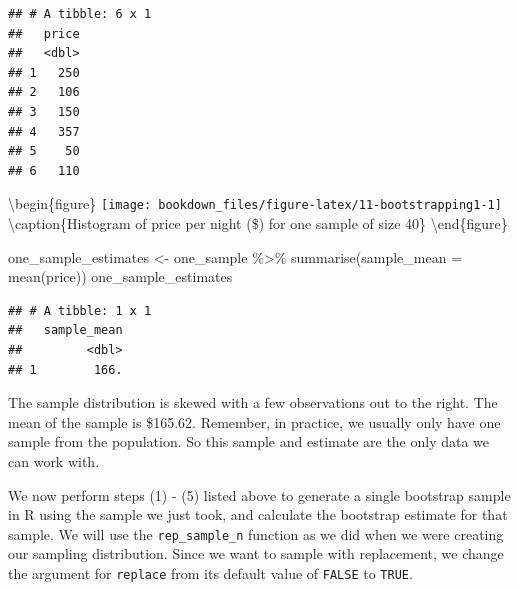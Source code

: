 \documentclass[
]{krantz}
\makeatletter
\newenvironment{Shaded}{\begin{snugshade}}{\end{snugshade}}
\newcommand{\AttributeTok}[1]{\textcolor[rgb]{0.61,0.61,0.61}{#1}}
\newcommand{\FunctionTok}[1]{\textcolor[rgb]{0,0,0}{#1}}
\newcommand{\NormalTok}[1]{#1}
\newcommand{\OtherTok}[1]{\textcolor[rgb]{0.37,0.37,0.37}{#1}}
\newcommand{\SpecialCharTok}[1]{\textcolor[rgb]{0,0,0}{#1}}
\newcommand{\StringTok}[1]{\textcolor[rgb]{0.5,0.5,0.5}{#1}}
\newenvironment{kframe}{%
\medskip{}
\setlength{\fboxsep}{.8em}
 \def\at@end@of@kframe{}%
 \ifinner\ifhmode%
  \def\at@end@of@kframe{\end{minipage}}%
  \begin{minipage}{\columnwidth}%
 \fi\fi%
 \def\FrameCommand##1{\hskip\@totalleftmargin \hskip-\fboxsep
 \colorbox{shadecolor}{##1}\hskip-\fboxsep
     \hskip-\linewidth \hskip-\@totalleftmargin \hskip\columnwidth}%
 \MakeFramed {\advance\hsize-\width
   \@totalleftmargin\z@ \linewidth\hsize
   \@setminipage}}%
 {\par\unskip\endMakeFramed%
 \at@end@of@kframe}
\renewenvironment{Shaded}{\begin{kframe}}{\end{kframe}}
\makeatother
\begin{document}
\begin{verbatim}
## # A tibble: 6 x 1
##   price
##   <dbl>
## 1   250
## 2   106
## 3   150
## 4   357
## 5    50
## 6   110
\end{verbatim}

\begin{Shaded}
\end{Shaded}

\textbackslash begin\{figure\}
\texttt{[image: bookdown\_files/figure-latex/11-bootstrapping1-1]} \textbackslash caption\{Histogram of price per night (\$) for one sample of size 40\}\label{fig:11-bootstrapping1}
\textbackslash end\{figure\}

\begin{Shaded}
\begin{Highlighting}[]
\NormalTok{one\_sample\_estimates }\OtherTok{\textless{}{-}}\NormalTok{ one\_sample }\SpecialCharTok{\%\textgreater{}\%}
  \FunctionTok{summarise}\NormalTok{(}\AttributeTok{sample\_mean =} \FunctionTok{mean}\NormalTok{(price))}
\NormalTok{one\_sample\_estimates}
\end{Highlighting}
\end{Shaded}

\begin{verbatim}
## # A tibble: 1 x 1
##   sample_mean
##         <dbl>
## 1        166.
\end{verbatim}

The sample distribution is skewed with a few observations out to the right. The
mean of the sample is \$165.62.
Remember, in practice, we usually only have one sample from the population. So
this sample and estimate are the only data we can work with.

We now perform steps (1) - (5) listed above to generate a single bootstrap sample in R using the
sample we just took, and calculate the bootstrap estimate for that sample. We
will use the \texttt{rep\_sample\_n} function as we did when we were creating our
sampling distribution. Since we want to sample with replacement, we change the
argument for \texttt{replace} from its default value of \texttt{FALSE} to \texttt{TRUE}.
\end{document}
